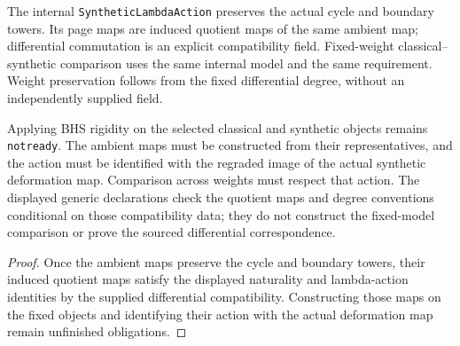 \begin{proposition}
  \label{prop:representative-induced-synthetic-comparison}
  \notready
  The internal \texttt{SyntheticLambdaAction} preserves the actual cycle
  and boundary towers.  Its page maps are induced quotient maps of the same
  ambient map; differential commutation is an explicit compatibility field.
  Fixed-weight classical--synthetic comparison uses the same internal model
  and the same requirement.  Weight preservation follows from the fixed
  differential degree, without an independently supplied field.

  Applying BHS rigidity on the selected classical and synthetic objects
  remains \texttt{notready}. The ambient maps must be constructed from their
  representatives, and the action must be identified with the regraded image
  of the actual synthetic deformation map. Comparison across weights must
  respect that action. The displayed generic declarations check the quotient
  maps and degree conventions conditional on those compatibility data; they
  do not construct the fixed-model comparison or prove the sourced
  differential correspondence.
\end{proposition}

\begin{proof}
  Once the ambient maps preserve the cycle and boundary towers, their induced
  quotient maps satisfy the displayed naturality and lambda-action identities
  by the supplied differential compatibility. Constructing those maps on the
  fixed objects and identifying their action with the actual deformation map
  remain unfinished obligations.
\end{proof}

